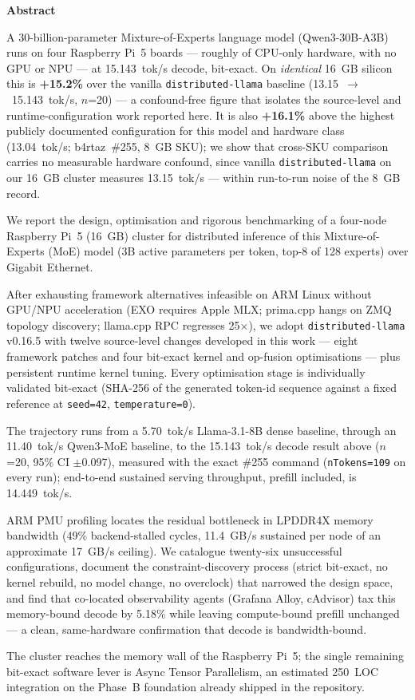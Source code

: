 \documentclass[10pt,a4paper]{article}
\providecommand{\euro}{}\renewcommand{\euro}{\texteuro}
\renewenvironment{abstract}{%
  \vspace{2pt}\begin{center}\textbf{Abstract}\end{center}\par\vspace{1pt}%
  \begingroup\small\setlength{\leftskip}{1.8em}\setlength{\rightskip}{1.8em}\noindent\ignorespaces
}{%
  \par\endgroup\vspace{10pt}%
}
\begin{document}
\begin{abstract}
A 30-billion-parameter Mixture-of-Experts language model (Qwen3-30B-A3B) runs on four Raspberry Pi~5 boards --- roughly \euro500 of CPU-only hardware, with no GPU or NPU --- at 15.143~tok/s decode, bit-exact. On \emph{identical} 16~GB silicon this is \textbf{+15.2\%} over the vanilla \texttt{distributed-llama} baseline (13.15~$\to$~15.143~tok/s, $n$=20) --- a confound-free figure that isolates the source-level and runtime-configuration work reported here. It is also \textbf{+16.1\%} above the highest publicly documented configuration for this model and hardware class (13.04~tok/s; b4rtaz~\#255, 8~GB SKU); we show that cross-SKU comparison carries no measurable hardware confound, since vanilla \texttt{distributed-llama} on our 16~GB cluster measures 13.15~tok/s --- within run-to-run noise of the 8~GB record.

We report the design, optimisation and rigorous benchmarking of a four-node Raspberry Pi~5 (16~GB) cluster for distributed inference of this Mixture-of-Experts (MoE) model (3B active parameters per token, top-8 of 128 experts) over Gigabit Ethernet.

After exhausting framework alternatives infeasible on ARM Linux without GPU/NPU acceleration (EXO requires Apple MLX; prima.cpp hangs on ZMQ topology discovery; llama.cpp RPC regresses 25$\times$), we adopt \texttt{distributed-llama} v0.16.5 with twelve source-level changes developed in this work --- eight framework patches and four bit-exact kernel and op-fusion optimisations --- plus persistent runtime kernel tuning. Every optimisation stage is individually validated bit-exact (SHA-256 of the generated token-id sequence against a fixed reference at \texttt{seed=42}, \texttt{temperature=0}).

The trajectory runs from a 5.70~tok/s Llama-3.1-8B dense baseline, through an 11.40~tok/s Qwen3-MoE baseline, to the 15.143~tok/s decode result above ($n$=20, 95\% CI $\pm$0.097), measured with the exact \#255 command (\texttt{nTokens=109} on every run); end-to-end sustained serving throughput, prefill included, is 14.449~tok/s.

ARM PMU profiling locates the residual bottleneck in LPDDR4X memory bandwidth (49\% backend-stalled cycles, 11.4~GB/s sustained per node of an approximate 17~GB/s ceiling). We catalogue twenty-six unsuccessful configurations, document the constraint-discovery process (strict bit-exact, no kernel rebuild, no model change, no overclock) that narrowed the design space, and find that co-located observability agents (Grafana Alloy, cAdvisor) tax this memory-bound decode by 5.18\% while leaving compute-bound prefill unchanged --- a clean, same-hardware confirmation that decode is bandwidth-bound.

The cluster reaches the memory wall of the Raspberry Pi~5; the single remaining bit-exact software lever is Async Tensor Parallelism, an estimated 250~LOC integration on the Phase~B foundation already shipped in the repository.
\end{abstract}
\end{document}
